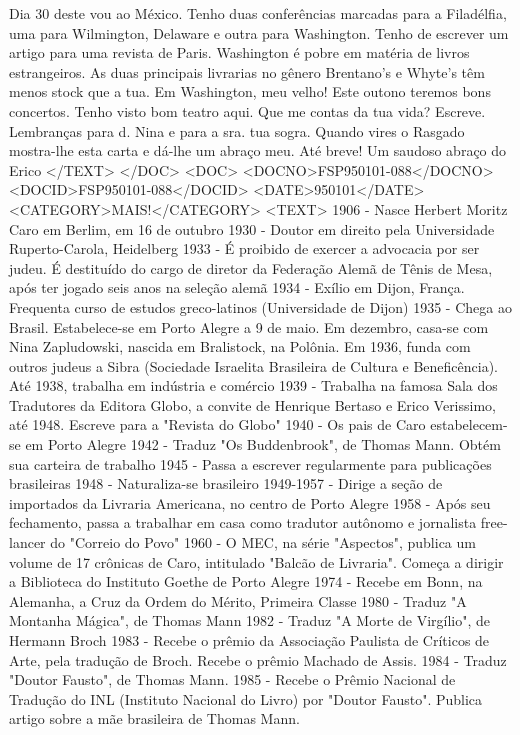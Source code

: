 Dia 30 deste vou ao México. Tenho duas conferências marcadas para a Filadélfia, uma para Wilmington, Delaware e outra para Washington. Tenho de escrever um artigo para uma revista de Paris.
Washington é pobre em matéria de livros estrangeiros. As duas principais livrarias no gênero Brentano's e Whyte's têm menos stock que a tua. Em Washington, meu velho!
Este outono teremos bons concertos. Tenho visto bom teatro aqui.
Que me contas da tua vida?
Escreve.
Lembranças para d. Nina e para a sra. tua sogra.
Quando vires o Rasgado mostra-lhe esta carta e dá-lhe um abraço meu.
Até breve!
Um saudoso abraço do
Erico
</TEXT>
</DOC>
<DOC>
<DOCNO>FSP950101-088</DOCNO>
<DOCID>FSP950101-088</DOCID>
<DATE>950101</DATE>
<CATEGORY>MAIS!</CATEGORY>
<TEXT>
1906 - Nasce Herbert Moritz Caro em Berlim, em 16 de outubro
1930 - Doutor em direito pela Universidade Ruperto-Carola, Heidelberg
1933 - É proibido de exercer a advocacia por ser judeu. É destituído do cargo de diretor da Federação Alemã de Tênis de Mesa, após ter jogado seis anos na seleção alemã
1934 - Exílio em Dijon, França. Frequenta curso de estudos greco-latinos (Universidade de Dijon)
1935 - Chega ao Brasil. Estabelece-se em Porto Alegre a 9 de maio. Em dezembro, casa-se com Nina Zapludowski, nascida em Bralistock, na Polônia. Em 1936, funda com outros judeus a Sibra (Sociedade Israelita Brasileira de Cultura e Beneficência). Até 1938, trabalha em indústria e comércio
1939 - Trabalha na famosa Sala dos Tradutores da Editora Globo, a convite de Henrique Bertaso e Erico Verissimo, até 1948. Escreve para a "Revista do Globo"
1940 - Os pais de Caro estabelecem-se em Porto Alegre
1942 - Traduz "Os Buddenbrook", de Thomas Mann. Obtém sua carteira de trabalho
1945 - Passa a escrever regularmente para publicações brasileiras
1948 - Naturaliza-se brasileiro
1949-1957 - Dirige a seção de importados da Livraria Americana, no centro de Porto Alegre
1958 - Após seu fechamento, passa a trabalhar em casa como tradutor autônomo e jornalista free-lancer do "Correio do Povo"
1960 - O MEC, na série "Aspectos", publica um volume de 17 crônicas de Caro, intitulado "Balcão de Livraria". Começa a dirigir a Biblioteca do Instituto Goethe de Porto Alegre
1974 - Recebe em Bonn, na Alemanha, a Cruz da Ordem do Mérito, Primeira Classe
1980 - Traduz "A Montanha Mágica", de Thomas Mann
1982 - Traduz "A Morte de Virgílio", de Hermann Broch
1983 - Recebe o prêmio da Associação Paulista de Críticos de Arte, pela tradução de Broch. Recebe o prêmio Machado de Assis.
1984 - Traduz "Doutor Fausto", de Thomas Mann.
1985 - Recebe o Prêmio Nacional de Tradução do INL (Instituto Nacional do Livro) por "Doutor Fausto". Publica artigo sobre a mãe brasileira de Thomas Mann.
